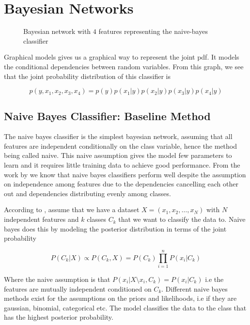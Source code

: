 \section{Bayesian Networks}

\begin{figure}[h!]
    \centering
    \caption{Bayesian network with $4$ features representing the naive-bayes classifier}
    \label{fig:my_label}
\end{figure}

Graphical models gives us a graphical way to represent the joint pdf. It models the conditional dependencies between random variables. From this graph, we see that the joint probability distribution of this classifier is

\begin{equation*}
    p(y, x_1, x_2, x_3, x_4) = p(y)p(x_1|y)p(x_2|y)p(x_3|y)p(x_4|y)
\end{equation*}

\subsection{Naive Bayes Classifier: Baseline Method}
\label{relatedwork:naivebayes}
The naive bayes classifier is the simplest bayesian network, assuming that all features are independent conditionally on the class variable, hence the method being called naive. This naive assumption gives the model few parameters to learn and it requires little training data to achieve good performance. From the work by \citet{Zhang:2004:AAAI} we know that naive bayes classifiers perform well despite the assumption on independence among features due to the dependencies cancelling each other out and dependencies distributing evenly among classes.

According to \citet[p.~217]{Ankan:2015:Book}, assume that we have a dataset $X = (x_1, x_2, \dots, x_N)$ with $N$ independent features and $k$ classes $C_k$ that we want to classify the data to. Naive bayes does this by modeling the posterior distribution in terms of the joint probability

$$
P(C_k | X) \propto P(C_k , X) = P(C_k) \prod_{i=1}^{n} P(x_i|C_k)
$$

Where the naive assumption is that $P(x_i | X \setminus x_i , C_k) = P(x_i | C_k)$ i.e the features are mutually independent conditioned on $C_k$. Different naive bayes methods exist for the assumptions on the priors and likelihoods, i.e if they are gaussian, binomial, categorical etc. The model classifies the data to the class that has the highest posterior probability. 

